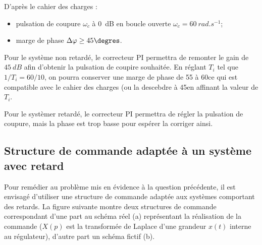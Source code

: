 

\ifprof
\begin{corrige}
D'après le cahier des charges : 
\begin{itemize}
\item pulsation de coupure $\omega_c$ à \SI{0}{dB} en boucle ouverte $\omega_c = \SI{60}{rad.s^{-1}}$;
\item marge de phase $\Delta \varphi \geq 45 \degres$.
\end{itemize}

Pour le système non retardé, le correcteur PI permettra de remonter le gain de $\SI{45}{dB}$ afin d'obtenir la pulsation de coupire souhaitée. En réglant $T_i$ tel que $1/T_i = 60/10$, on pourra conserver une marge de phase de 55 à 60\degres ce qui est compatible avec le cahier des charges (ou la descebdre à 45\degres en affinant la valeur de $T_i$.


Pour le systèmer retardé, le correcteur PI permettra de régler la pulsation de coupure, mais la phase est trop basse pour espérer la corriger ainsi.  
\end{corrige}
\else
\fi


\subsection*{Structure de commande adaptée à un système avec retard}
Pour remédier au problème mis en évidence à la question précédente, il est envisagé d’utiliser une structure de commande
adaptée aux systèmes comportant des retards. La figure suivante montre deux structures de commande correspondant
d’une part au schéma réel (a) représentant la réalisation de la commande ($X(p)$ est la transformée de Laplace
d’une grandeur $x(t)$ interne au régulateur), d’autre part un schéma fictif (b).

